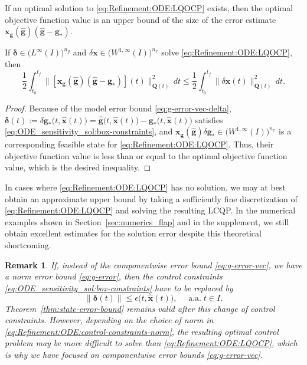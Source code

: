 \documentclass[onefignum,onetabnum]{siamart220329}
\numberwithin{equation}{section}
\newcommand{\aall}{\mbox{ a.a.} \;}
\newcommand{\bg}{\ensuremath{\mathbf{g}}} %
\newcommand{\bx}{\ensuremath{\mathbf{x}}} %
\newcommand {\bdelta} {\boldsymbol{\delta}}
\newcommand{\BQ}{\ensuremath{\mathbf{Q}} } %
\newcommand{\WW}{\big( W^{1, \infty}(I) \big)^{n_x}}
\newtheorem{remark}[theorem]{Remark}
\begin{document}
If an optimal solution to \eqref{eq:Refinement:ODE:LQOCP} exists, then the optimal objective function value
is an upper bound of the size of the error estimate 
$\bx_\bg(\widehat{\bg})  (\widehat{\bg} - \bg_*)$.
\begin{theorem}   \label{thm:state-error-bound}
     If $\bdelta \in \big(L^\infty(I) \big)^{n_g}$ and $\delta \bx \in \WW$ solve \eqref{eq:Refinement:ODE:LQOCP},
     then 
     \[
         \frac{1}{2} \int_{t_0}^{t_f}   \big\| [\bx_\bg(\widehat{\bg})  (\widehat{\bg} - \bg_*)](t)  \big\|_{\BQ(t)}^2 \, dt 
         \le  \frac{1}{2} \int_{t_0}^{t_f}  \big\| \delta \bx(t) \big\|_{\BQ(t)}^2 \, dt. 
     \]
\end{theorem}
\begin{proof}
    Because of the model error bound \eqref{eq:g-error-vec-delta}, 
    $\bdelta(t) := \delta \bg_*\big(t, \widehat{\bx}(t)\big) = \widehat{\bg}\big(t, \widehat{\bx}(t)\big) - \bg_*\big(t, \widehat{\bx}(t)\big)$
    satisfies \eqref{eq:ODE_sensitivity_sol:box-constraints}, and 
    $\bx_\bg(\widehat{\bg}) \delta \bg_* \in \WW$ 
    is a corresponding  feasible state  for  \eqref{eq:Refinement:ODE:LQOCP}.
    Thus, their objective function value is less than or equal to the optimal objective function value,
    which is the desired inequality.
\end{proof}
In cases where \eqref{eq:Refinement:ODE:LQOCP} has no solution, we may at best obtain an approximate upper bound by taking a sufficiently fine discretization of \eqref{eq:Refinement:ODE:LQOCP} and solving the resulting LCQP. 
In the numerical examples shown in Section~\ref{sec:numerics_flap} and in the supplement, we still obtain excellent estimates for the solution error despite this theoretical shortcoming.


\begin{remark}   \label{rem:Refinement:ODE:control-constraints-norm}
     If,  instead of the   componentwise error bound \eqref{eq:g-error-vec}, we have
     a norm error bound \eqref{eq:g-error}, then the control constraints \eqref{eq:ODE_sensitivity_sol:box-constraints}
     have to be replaced by
     \begin{equation} \label{eq:Refinement:ODE:control-constraints-norm}
            \|   \bdelta( t )  \|  \leq  \epsilon\big( t, \widehat{\bx}(t) \big), \quad \aall t \in I.
     \end{equation}
     Theorem~\ref{thm:state-error-bound} remains valid after this change of control constraints.
     However, depending on the choice of norm in \eqref{eq:Refinement:ODE:control-constraints-norm}, the
     resulting optimal control problem may be more difficult to solve than \eqref{eq:Refinement:ODE:LQOCP},
     which is why we have focused on componentwise error bounds \eqref{eq:g-error-vec}.
\end{remark}
\end{document}
